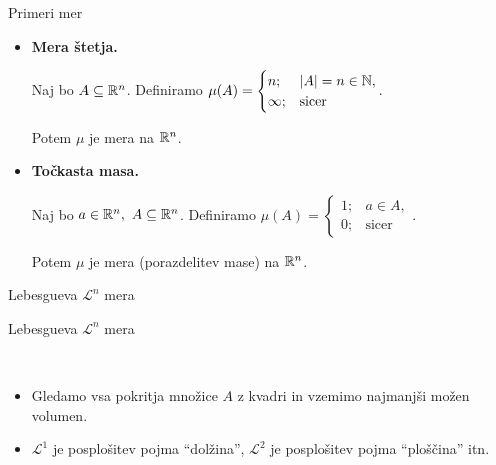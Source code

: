 \documentclass[10pt]{beamer}
\begin{document}
\begin{frame}{Primeri mer}
    \begin{itemize}
        \item \textbf{Mera štetja.}
        
        Naj bo \(A \subseteq \mathbb{R}^n\). Definiramo \(\mu(A) = \begin{cases}
            n; &|A| = n \in \mathbb{N}, \\ \infty; &\text{sicer}
        \end{cases}\).
        
        Potem \(\mu\) je mera na \(\mathbb{R}^n\).
        \item \textbf{Točkasta masa.}
        
        Naj bo \(a \in \mathbb{R}^n, \ A \subseteq \mathbb{R}^n\). Definiramo \(\mu(A) = \begin{cases}
            1; &a \in A, \\ 0; &\text{sicer}
        \end{cases}\).
    
        Potem \(\mu\) je mera (porazdelitev mase) na \(\mathbb{R}^n\).
    \end{itemize}
\end{frame}

\begin{frame}[t]{Lebesgueva \(\mathcal{L}^n\) mera}

\end{frame}

\begin{frame}{Lebesgueva \(\mathcal{L}^n\) mera}
    \begin{opomba} \
        \begin{itemize}
            \item Gledamo vsa pokritja množice \(A\) z kvadri in vzemimo najmanjši možen volumen.
            \item \(\mathcal{L}^1\) je posplošitev pojma "`dolžina"', \(\mathcal{L}^2\) je posplošitev pojma "`ploščina"' itn.
        \end{itemize}            
    \end{opomba}  
\end{frame}
\end{document}
